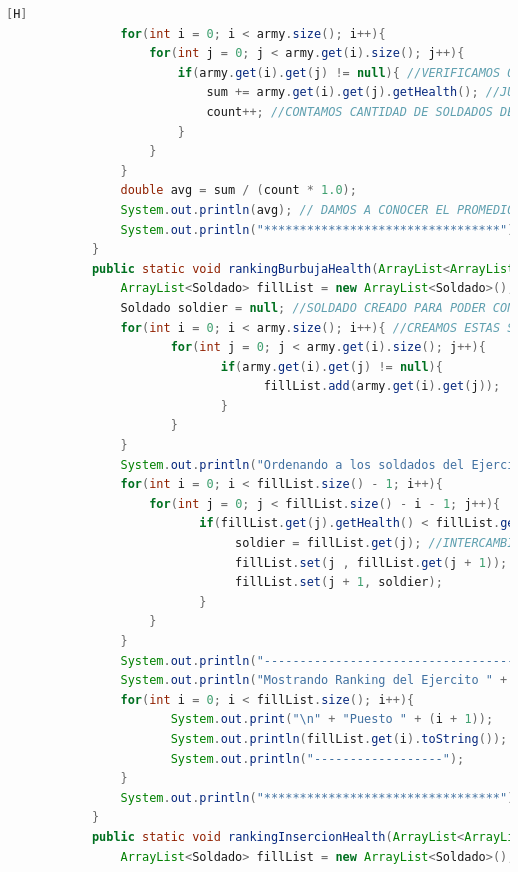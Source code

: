 \documentclass{article}
\begin{document}
\begin{lstlisting}[language=java,caption={Las lineas de codigo :}][H]
				for(int i = 0; i < army.size(); i++){
					for(int j = 0; j < army.get(i).size(); j++){
						if(army.get(i).get(j) != null){ //VERIFICAMOS QUE EL SOLDADO DE CADA CASILLA SEA NO NULO 
							sum += army.get(i).get(j).getHealth(); //JUNTAMOS LOS VALORES DE VIDA DE CADA SOLDADO DE CADA EJERCITO 
							count++; //CONTAMOS CANTIDAD DE SOLDADOS DE CADA EJERCITO PARA DESPUES PODER DIVIDIRLO CON LA SUMA DE VIDA DE CADA EJERCITO
						}
					}
				}
				double avg = sum / (count * 1.0);
				System.out.println(avg); // DAMOS A CONOCER EL PROMEDIO DE VIDA DE CADA EJERCITO 
				System.out.println("*********************************");
			}
			public static void rankingBurbujaHealth(ArrayList<ArrayList<Soldado>> army, int num){
				ArrayList<Soldado> fillList = new ArrayList<Soldado>(); //CREAMOS ESTE ARRAYLIST PARA PODER GUARDAR A LOS SOLDADOS EN UN SOLO ARRAYLIST EL CUAL SEA EFECTIVO EL METODO BURBUJA 
				Soldado soldier = null; //SOLDADO CREADO PARA PODER CONTENER EL INTERCAMBIO ENTRE SOLDADOS EN EL METODO BURBUJA
				for(int i = 0; i < army.size(); i++){ //CREAMOS ESTAS SENTENCIAS PARA PODER VERIFICAR EL NUMERO DE SOLDADOS PARA DESPUES PONER EL RANKING DE PUESTOS DE CADA UNO DE ESTOS SOLDADOS
					   for(int j = 0; j < army.get(i).size(); j++){
							  if(army.get(i).get(j) != null){
									fillList.add(army.get(i).get(j));
							  }
					   }
				}
				System.out.println("Ordenando a los soldados del Ejercito " + num + " por el metodo burbuja: "); //APLICAMOS EL METODO BURBUJA CON LOS PUNTOS DE VIDA
				for(int i = 0; i < fillList.size() - 1; i++){
					for(int j = 0; j < fillList.size() - i - 1; j++){
						   if(fillList.get(j).getHealth() < fillList.get(j + 1).getHealth()){
								soldier = fillList.get(j); //INTERCAMBIO
								fillList.set(j , fillList.get(j + 1));
								fillList.set(j + 1, soldier);
						   }
					}      
				}
				System.out.println("------------------------------------------");
				System.out.println("Mostrando Ranking del Ejercito " + num + "....."); //MOSTRADOR DE RANKING DE LOS SOLDADOS
				for(int i = 0; i < fillList.size(); i++){
					   System.out.print("\n" + "Puesto " + (i + 1));
					   System.out.println(fillList.get(i).toString());
					   System.out.println("------------------");
				}
				System.out.println("*********************************");
			}
			public static void rankingInsercionHealth(ArrayList<ArrayList<Soldado>> army, int num){
				ArrayList<Soldado> fillList = new ArrayList<Soldado>(); //CREAMOS ESTE ARRAYLIST PARA PODER GUARDAR A LOS SOLDADOS EN UN SOLO ARRAYLIST EL CUAL SEA EFECTIVO EL METODO INSERCION 

\end{lstlisting}
\end{document}
